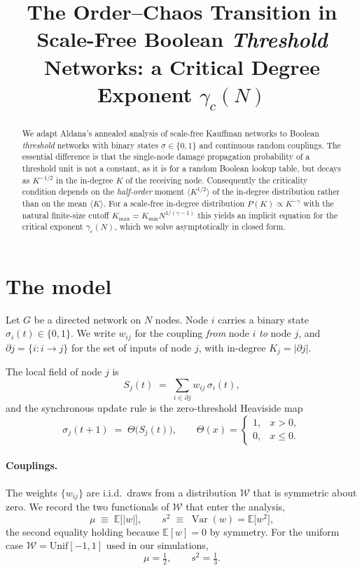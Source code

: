 \documentclass[11pt]{article}
\title{The Order--Chaos Transition in Scale-Free Boolean \emph{Threshold}
Networks: a Critical Degree Exponent $\gamma_c(N)$}
\author{}
\date{}
\theoremstyle{remark}
\newcommand{\E}{\mathbb{E}}
\newcommand{\Kmin}{K_{\mathrm{min}}}
\newcommand{\Kmax}{K_{\mathrm{max}}}
\begin{document}
\maketitle

\begin{abstract}
We adapt Aldana's annealed analysis of scale-free Kauffman networks to Boolean
\emph{threshold} networks with binary states $\sigma\in\{0,1\}$ and continuous
random couplings. The essential difference is that the single-node damage
propagation probability of a threshold unit is not a constant, as it is for a
random Boolean lookup table, but decays as $K^{-1/2}$ in the in-degree $K$ of the
receiving node. Consequently the criticality condition depends on the
\emph{half-order} moment $\langle K^{1/2}\rangle$ of the in-degree distribution
rather than on the mean $\langle K\rangle$. For a scale-free in-degree
distribution $P(K)\propto K^{-\gamma}$ with the natural finite-size cutoff
$\Kmax=\Kmin N^{1/(\gamma-1)}$ this yields an implicit equation for the critical
exponent $\gamma_c(N)$, which we solve asymptotically in closed form.
\end{abstract}

\section{The model}

Let $G$ be a directed network on $N$ nodes. Node $i$ carries a binary state
$\sigma_i(t)\in\{0,1\}$. We write $w_{ij}$ for the coupling \emph{from} node $i$
\emph{to} node $j$, and $\partial j=\{i: i\to j\}$ for the set of inputs of
node $j$, with in-degree $K_j=|\partial j|$.

The local field of node $j$ is
\begin{equation}
  S_j(t) \;=\; \sum_{i\in\partial j} w_{ij}\,\sigma_i(t),
  \label{eq:field}
\end{equation}
and the synchronous update rule is the zero-threshold Heaviside map
\begin{equation}
  \sigma_j(t+1) \;=\; \Theta\big(S_j(t)\big),
  \qquad
  \Theta(x)=\begin{cases}1,& x>0,\\ 0,& x\le 0.\end{cases}
  \label{eq:update}
\end{equation}

\paragraph{Couplings.} The weights $\{w_{ij}\}$ are i.i.d.\ draws from a
distribution $\mathcal{W}$ that is symmetric about zero. We record the two
functionals of $\mathcal{W}$ that enter the analysis,
\begin{equation}
  \mu \;\equiv\; \E\big[|w|\big],
  \qquad
  s^2 \;\equiv\; \operatorname{Var}(w)=\E\big[w^2\big],
  \label{eq:weightmoments}
\end{equation}
the second equality holding because $\E[w]=0$ by symmetry. For the uniform
case $\mathcal{W}=\mathrm{Unif}[-1,1]$ used in our simulations,
\begin{equation}
  \mu=\tfrac12,\qquad s^2=\tfrac13 .
  \label{eq:uniform}
\end{equation}
\end{document}

